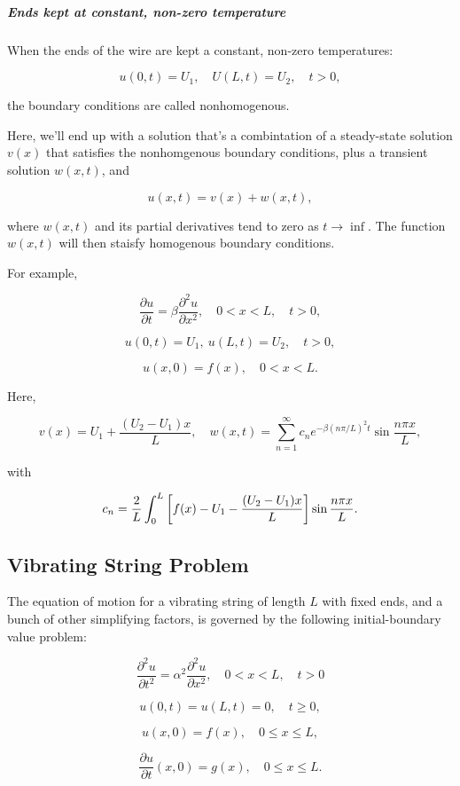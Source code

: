 \documentclass{article}
\begin{document}
\subparagraph{Ends kept at constant, non-zero temperature}

When the ends of the wire are kept a constant, non-zero temperatures:

\[ u(0, t) = U_1, \quad U(L,t) = U_2, \quad t > 0, \]

the boundary conditions are called nonhomogenous.

Here, we'll end up with a solution that's a combintation of a steady-state solution $v(x)$ that satisfies the nonhomgenous boundary conditions, plus a transient solution $w(x,t)$, and

\[ u(x,t) = v(x) + w(x,t), \]

where $w(x,t)$ and its partial derivatives tend to zero as $t \to \inf$. The function $w(x,t)$ will then staisfy homogenous boundary conditions.

For example, 

\[ \frac{\partial u}{\partial t} = \beta \frac{\partial^2 u}{\partial x^2}, \quad 0 < x < L, \quad t > 0, \tag{11b} \]

\[ u(0, t) = U_1, ~ u(L, t) = U_2, \quad t>0, \tag{12b} \]

\[ u(x,0) = f(x), \quad 0 < x < L. \tag{13b} \]
 

Here,

\[ v(x) = U_1 + \frac{(U_2 - U_1)x}{L}, \quad w(x,t) = \sum_{n=1}^{\infty} c_n e^{-\beta(n\pi/L)^2t}\sin{\frac{n \pi x}{L}}, \]

with

\[ c_n = \frac{2}{L}\int_{0}^{L} \left[f(x) -U_1 - \frac{(U_2 - U_1)x}{L}\right] \sin{\frac{n \pi x}{L}}. \] 

\subsection{Vibrating String Problem}

The equation of motion for a vibrating string of length $L$ with fixed ends, and a bunch of other simplifying factors, is governed by the following initial-boundary value problem:

\[ \frac{\partial^2 u}{\partial t^2} = \alpha^2 \frac{\partial^2 u}{\partial x^2}, \quad 0 < x < L, \quad t > 0 \tag{16} \]

\[ u(0,t) = u(L,t) = 0, \quad t \geq 0, \tag{17} \]

\[ u(x,0) = f(x), \quad 0 \leq x \leq L, \tag{18} \]

\[ \frac{\partial u}{\partial t}(x, 0) = g(x), \quad 0 \leq x \leq L. \tag{19} \]
\end{document}
